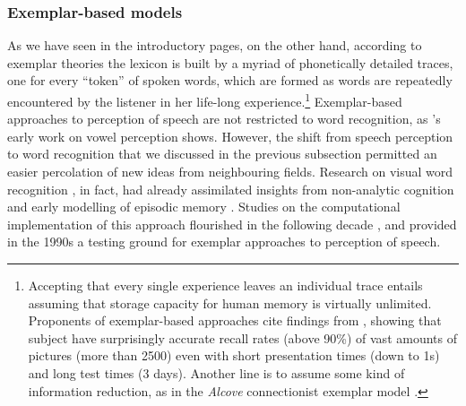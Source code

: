 \subsubsection{Exemplar-based models}\label{sec1113}
As we have seen in the introductory pages, on the other hand, according to exemplar theories the lexicon is built by a myriad of phonetically detailed traces, one for every ``token'' of spoken words, which are formed as words are repeatedly encountered by the listener in her life-long experience.\footnote{Accepting that every single experience leaves an individual trace entails assuming that storage capacity for human memory is virtually unlimited. Proponents of exemplar-based approaches cite findings from \citet{standing1970perception}, showing that subject have surprisingly accurate recall rates (above 90\%) of vast amounts of pictures (more than 2500) even with short presentation times (down to 1s) and long test times (3 days). Another line is to assume some kind of information reduction, as in the \textit{Alcove} connectionist exemplar model \citep{kruschke1992alcove}.} Exemplar-based approaches to perception of speech are not restricted to word recognition, as \citeauthor{johnson1997speech}'s \citeyearpar{johnson1997speech} early work on vowel perception shows. However, the shift from speech perception to word recognition that we discussed in the previous subsection permitted an easier percolation of new ideas from neighbouring fields. Research on visual word recognition \citep{tenpenny1995abstractionist}, in fact, had already assimilated insights from non-analytic cognition \citep{brooks1978nonanalytic} and  early modelling of episodic memory \citep{medin1978context}. Studies on the computational implementation of this approach flourished in the following decade \citep{mcclelland1981retrieving, hintzman1986schema, nosofsky1986attention}, and provided in the 1990s a testing ground for exemplar approaches to perception of speech.

